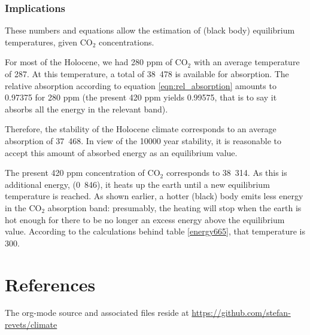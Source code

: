 \documentclass[10pt,a4paper,titlepage]{article}
\begin{document}
\subsubsection{Implications}
\label{sec-3-4-2}
These numbers and equations allow the estimation of (black body)
equilibrium temperatures, given CO$_{\text{2}}$ concentrations.

For most of the Holocene, we had 280 ppm of CO$_{\text{2}}$ with an average
temperature of \unit{287}{\kelvin}. At this temperature, a total of
\unit{38.478}{\watt\per\metre\squared} is available for absorption. The
relative absorption according to equation \ref{eqn:rel_absorption}
amounts to 0.97375 for 280 ppm (the present 420 ppm yields 0.99575,
that is to say it absorbs all the energy in the relevant band).

Therefore, the stability of the Holocene climate corresponds to an
average absorption of \unit{37.468}{\watt\per\metre\squared}. In view
of the 10000 year stability, it is reasonable to accept this amount of
absorbed energy as an equilibrium value.

The present 420 ppm concentration of CO$_{\text{2}}$ corresponds to
\unit{38.314}{\watt\per\metre\squared}. As this is additional energy,
(\unit{0.846}{\watt\per\metre\squared}), it heats up the earth until a
new equilibrium temperature is reached. As shown earlier, a hotter
(black) body emits less energy in the CO$_{\text{2}}$ absorption band:
presumably, the heating will stop when the earth is hot enough for
there to be no longer an excess energy above the equilibrium
value. According to the calculations behind table
\ref{energy665}, that temperature is \unit{300}{\kelvin}.

\section{References}
\label{sec-4}
The org-mode source and associated files reside at \url{https://github.com/stefan-revets/climate}



\end{document}
